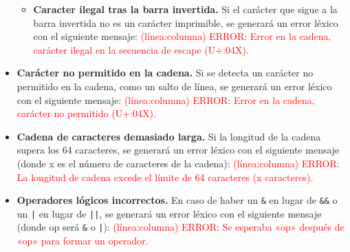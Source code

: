 \begin{itemize}[left=1cm]
\begin{itemize}
        \item \textbf{Caracter ilegal tras la barra invertida.} Si el carácter que sigue a la barra invertida no es un carácter imprimible, se generará un error léxico con el siguiente mensaje: \textcolor{red}{(línea:columna) ERROR: Error en la cadena, carácter ilegal en la secuencia de escape (U+{:04X}).}
    \end{itemize}
    \item \textbf{Carácter no permitido en la cadena.} Si se detecta un carácter no permitido en la cadena, como un salto de línea, se generará un error léxico con el siguiente mensaje: \textcolor{red}{(línea:columna) ERROR: Error en la cadena, carácter no permitido (U+{:04X}).}
    \item \textbf{Cadena de caracteres demasiado larga.} Si la longitud de la cadena supera los 64 caracteres, se generará un error léxico con el siguiente mensaje (donde x es el número de caracteres de la cadena): \textcolor{red}{(línea:columna) ERROR: La longitud de cadena excede el límite de 64 caracteres (x caracteres).}
    \item \textbf{Operadores lógicos incorrectos.} En caso de haber un \verb!&! en lugar de \verb!&&! o un \verb!|! en lugar de \verb!||!, se generará un error léxico con el siguiente mensaje (donde op será \verb!&! o \verb!|!): \textcolor{red}{(línea:columna) ERROR: Se esperaba «op» después de «op» para formar un operador.}
\end{itemize}
